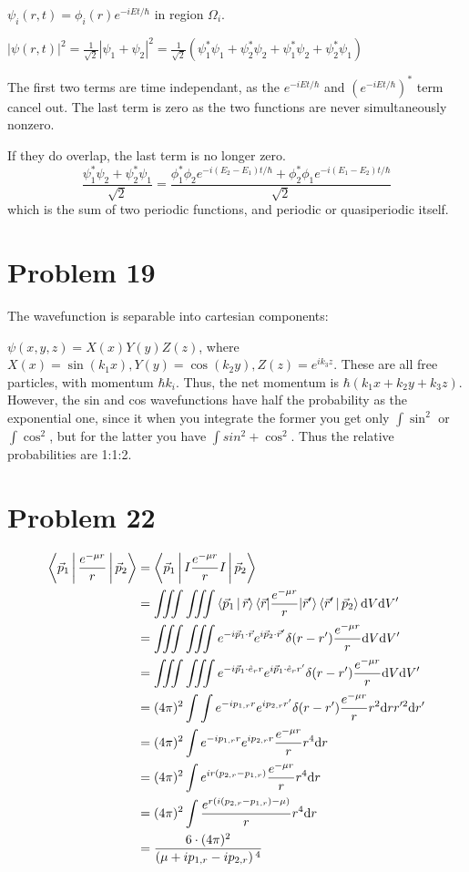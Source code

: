 \documentclass[12pt]{article}
\begin{document}
$\psi_i(r,t)=\phi_i(r)e^{-iEt/\hbar}$ in region $\Omega_i$.

$|\psi(r,t)|^2=\frac1{\sqrt{2}}|\psi_1+\psi_2|^2=\frac1{\sqrt{2}}\left(\psi_1^*\psi_1+\psi_2^*\psi_2+\psi_1^*\psi_2+\psi_2^*\psi_1\right)$

The first two terms are time independant, as the $e^{-iEt/\hbar}$ and $\left(e^{-iEt/\hbar}\right)^*$ term cancel out. The last term is zero as the two functions are never simultaneously nonzero.

If they do overlap, the last term is no longer zero. $$\frac{\psi_1^*\psi_2+\psi_2^*\psi_1}{\sqrt{2}}=\frac{\phi_1^*\phi_2 e^{-i(E_2-E_1)t/\hbar} + \phi_2^*\phi_1 e^{-i(E_1-E_2)t/\hbar}}{\sqrt{2}}$$ which is the sum of two periodic functions, and periodic or quasiperiodic itself.

\section*{Problem 19}

The wavefunction is separable into cartesian components:

$\psi(x,y,z)=X(x)Y(y)Z(z)$, where $X(x)=\sin(k_1 x), Y(y)=\cos(k_2 y), Z(z)=e^{ik_3z}$. These are all free particles, with momentum $\hbar k_i$. Thus, the net momentum is $\hbar\left(k_1x+k_2y+k_3z\right)$. However, the sin and cos wavefunctions have half the probability as the exponential one, since it when you integrate the former you get only $\int \sin^2$ or $\int \cos^2$, but for the latter you have $\int sin^2+\cos^2$. Thus the relative probabilities are 1:1:2.

\section*{Problem 22}
\begin{align*}
\Braket{\vec p_1|\frac{e^{-\mu r}}{r}|\vec p_2} &= \Braket{\vec p_1|I\frac{e^{-\mu r}}{r}I|\vec p_2}\\
&=\iiint\iiint\Braket{\vec p_1|\vec r}\braket{\vec r|\frac{e^{-\mu r}}{r}|\vec r'}\Braket{\vec r'|\vec p_2} \mathrm d V \mathrm dV'\\
&= \iiint \iiint e^{-i\vec p_1\cdot\vec r}e^{i\vec p_2\cdot\vec r'}\delta(r-r')\frac{e^{-\mu r}}{r}\mathrm dV\mathrm dV'\\
&= \iiint \iiint e^{-i\vec p_1\cdot\hat e_r r}e^{i\vec p_1\cdot\hat e_r r'}\delta(r-r')\frac{e^{-\mu r}}{r}\mathrm dV\mathrm dV'\\
&= (4\pi)^2\int\int e^{-i p_{1,r}r}e^{i p_{2,r} r'}\delta(r-r')\frac{e^{-\mu r}}{r}r^2\mathrm drr'^2\mathrm dr'\\
&=(4\pi)^2 \int e^{-i p_{1,r} r}e^{ip_{2,r} r}\frac{e^{-\mu r}}{r}r^4\mathrm dr\\
&= (4\pi)^2\int e^{ir(p_{2,r}-p_{1,r})} \frac{e^{-\mu r}}{r} r^4\mathrm dr\\
&= (4\pi)^2\int \frac{e^{r(i(p_{2,r}-p_{1,r})-\mu)}}{r}r^4\mathrm dr\\
&= \frac{6\cdot (4\pi)^2}{\left(\mu +i p_{1,r}-i p_{2,r}\right){}^4}
\end{align*}
\end{document}
